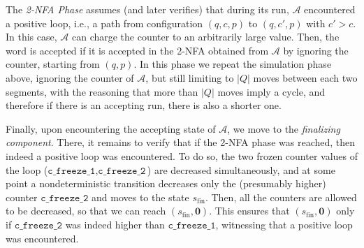 \documentclass[USenglish]{lipics-v2021}
\newcommand{\tup}[1]{\langle #1 \rangle}
\newcommand{\initstate}{q_{\mathrm{init}}}
\newcommand{\accstate}{q_{\mathrm{acc}}}
\renewcommand{\vec}[1]{\boldsymbol{#1}}
\newcommand{\adds}[1]{\leftarrow #1}
\newcommand{\vf}[1]{\texttt{#1}}
\newcommand{\cA}{\mathcal{A}}
\newcommand{\cV}{\mathcal{V}}
\begin{document}
The \emph{2-NFA Phase} assumes (and later verifies) that during its
run, $\cA$ encountered a positive loop, i.e., a path from configuration
$(q,c,p)$ to $(q,c',p)$ with $c'>c$. In this case, $\cA$ can charge the counter
to an arbitrarily large value. Then, the word is accepted if it is accepted in
the 2-NFA obtained from $\cA$ by ignoring the counter, starting from
$(q,p)$. In this phase we repeat the simulation phase above, ignoring the
counter of $\cA$, but still limiting to $|Q|$ moves between each two segments,
with the reasoning that more than $|Q|$ moves imply a cycle, and therefore if
there is an accepting run, there is also a shorter one.

Finally, upon encountering the accepting state of $\cA$, we move to
the \emph{finalizing component}. There, it remains to verify that if the 2-NFA
phase was reached, then indeed a positive loop was encountered. To do so, the
two frozen counter values of the loop ($\vf{c\_freeze\_1},\vf{c\_freeze\_2}$) are decreased simultaneously, and at some
point a nondeterministic transition decreases only the (presumably
higher) counter $\vf{c\_freeze\_2}$ and moves to the state $s_{\textrm{fin}}$. Then, all the
counters are allowed to be decreased, so that we can reach
$(s_{\textrm{fin}},\vec{0})$. 
This ensures that $(s_{\textrm{fin}},\vec{0})$ only if $\vf{c\_freeze\_2}$ was indeed higher than $\vf{c\_freeze\_1}$, witnessing that a positive loop was encountered.


\end{document}
